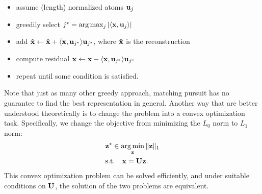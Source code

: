 \documentclass[../book-template.tex]{subfiles}
\begin{document}
\begin{itemize}
	\item assume (length) normalized atoms ${\bf u}_j$
	\item greedily select $j^*=\arg\max_j|\langle {\bf x},{\bf u}_j\rangle|$
	\item add $\hat{\bf x}\leftarrow \hat{\bf x} + \langle {\bf x},{\bf u}_{j^*}\rangle {\bf u}_{j^*}$, where $\hat{\bf x}$ is the reconstruction
	\item compute residual ${\bf x}\leftarrow {\bf x} - \langle {\bf x},{\bf u}_{j^*}\rangle {\bf u}_{j^*}$
	\item repeat until some condition is satisfied.
\end{itemize}
Note that just as many other greedy approach, matching pursuit has no guarantee to find the best representation in general. Another way that are better understood theoretically is to change the problem into a convex optimization task. Specifically, we change the objective from minimizing the $L_0$ norm to $L_1$ norm:
\begin{align}
	\label{eq_9_L1}&{\bf z}^*\in\mathop{\arg\min}_{\bf z}\|{\bf z}\|_1\\
&{\rm s.t.}\quad {\bf x}={\bf Uz}.\notag
\end{align}
This convex optimization problem can be solved efficiently, and under suitable conditions on ${\bf U}$, the solution of the two problems are equivalent.
\end{document}
